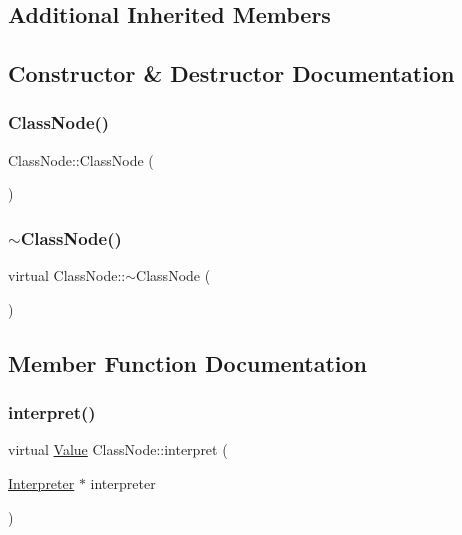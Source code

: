 \subsection*{Additional Inherited Members}


\subsection{Constructor \& Destructor Documentation}
\mbox{\label{classClassNode_a217389d155a37b90d12fa6a9d49d6326}} 
\subsubsection{\texorpdfstring{Class\+Node()}{ClassNode()}}
{\footnotesize\ttfamily Class\+Node\+::\+Class\+Node (\begin{DoxyParamCaption}{ }\end{DoxyParamCaption})}

\mbox{\label{classClassNode_a3c0d617d08db3d2f0e9ade88f30bb04d}} 
\subsubsection{\texorpdfstring{$\sim$\+Class\+Node()}{~ClassNode()}}
{\footnotesize\ttfamily virtual Class\+Node\+::$\sim$\+Class\+Node (\begin{DoxyParamCaption}{ }\end{DoxyParamCaption})\hspace{0.3cm}{\ttfamily [virtual]}}



\subsection{Member Function Documentation}
\mbox{\label{classClassNode_a7515421face64d74e99e180fb297684b}} 
\subsubsection{\texorpdfstring{interpret()}{interpret()}}
{\footnotesize\ttfamily virtual \hyperlink{classValue}{Value} Class\+Node\+::interpret (\begin{DoxyParamCaption}\item[{\hyperlink{classInterpreter}{Interpreter} $\ast$}]{interpreter }\end{DoxyParamCaption})\hspace{0.3cm}{\ttfamily [virtual]}}



